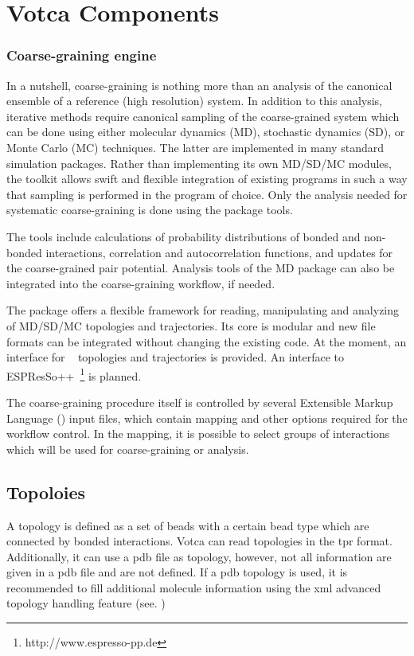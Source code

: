 \chapter{Votca Components}
\subsection{Coarse-graining engine}

In a nutshell, coarse-graining is nothing more than an analysis of the canonical ensemble of a reference (high resolution) system. In addition to this analysis, iterative methods require canonical sampling of the coarse-grained system which can be done using either molecular dynamics (MD), stochastic dynamics (SD), or Monte Carlo (MC) techniques. The latter are implemented in many standard simulation packages. Rather than implementing its own MD/SD/MC modules, the toolkit allows swift and flexible integration of existing  programs in such a way that sampling is performed in the program of choice. Only the analysis needed for systematic coarse-graining is done using the package tools.

The tools include calculations of probability distributions of bonded and non-bonded interactions, correlation and autocorrelation functions, and updates for the coarse-grained pair potential. Analysis tools of the MD package can also be integrated into the coarse-graining workflow, if needed.

The package offers a flexible framework for reading, manipulating and analyzing of MD/SD/MC topologies and trajectories. Its core is modular and new file formats can be integrated without changing the existing code. At the moment, an interface for \gromacs~\cite{gromacs4} topologies and trajectories is provided. An interface to ESPResSo++~\footnote{{\rm http://www.espresso-pp.de} } is planned.

The coarse-graining procedure itself is controlled by several Extensible Markup Language (\xml) input files, which contain mapping and other options required for the workflow control. In the mapping, it is possible to select groups of interactions which will be used for coarse-graining or analysis. 


\section{Topoloies}
A topology is defined as a set of beads with a certain bead type which are connected by bonded interactions.
Votca can read topologies in the \gromacs tpr format. Additionally, it can use a pdb file as topology, however, not all information are given in a pdb file and are not defined. If a pdb topology is used, it is recommended to fill additional molecule information using the xml advanced topology handling feature (see. )
